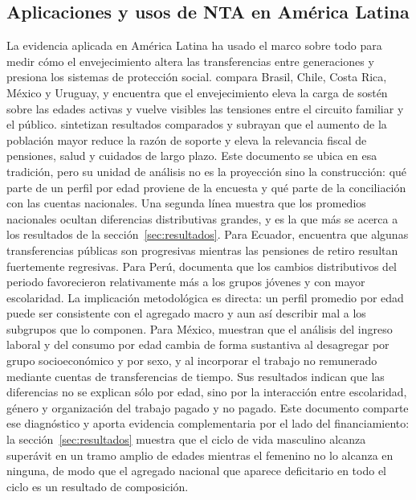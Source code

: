 \documentclass[11pt,a4paper]{article}
\begin{document}
\subsection{Aplicaciones y usos de NTA en América Latina}
La evidencia aplicada en América Latina ha usado el marco sobre todo para medir cómo el
envejecimiento altera las transferencias entre generaciones y presiona los sistemas de protección
social. \citet{RoseroBixby2011Generational} compara Brasil, Chile, Costa Rica, México y Uruguay, y
encuentra que el envejecimiento eleva la carga de sostén sobre las edades activas y vuelve
visibles las tensiones entre el circuito familiar y el público. \citet{Mason2011Population}
sintetizan resultados comparados y subrayan que el aumento de la población mayor reduce la razón
de soporte y eleva la relevancia fiscal de pensiones, salud y cuidados de largo plazo. Este
documento se ubica en esa tradición, pero su unidad de análisis no es la proyección sino la
construcción: qué parte de un perfil por edad proviene de la encuesta y qué parte de la
conciliación con las cuentas nacionales.
Una segunda línea muestra que los promedios nacionales ocultan diferencias distributivas grandes,
y es la que más se acerca a los resultados de la sección~\ref{sec:resultados}. Para Ecuador,
\citet{Rosero2024Socioeconomic} encuentra que algunas transferencias públicas son progresivas
mientras las pensiones de retiro resultan fuertemente regresivas. Para Perú,
\citet{Olivera2023distributive} documenta que los cambios distributivos del periodo favorecieron
relativamente más a los grupos jóvenes y con mayor escolaridad. La implicación metodológica es
directa: un perfil promedio por edad puede ser consistente con el agregado macro y aun así
describir mal a los subgrupos que lo componen.
Para México, \citet{MejiaGuevaraRivero2024} muestran que el análisis del ingreso laboral y del
consumo por edad cambia de forma sustantiva al desagregar por grupo socioeconómico y por sexo, y
al incorporar el trabajo no remunerado mediante cuentas de transferencias de tiempo. Sus
resultados indican que las diferencias no se explican sólo por edad, sino por la interacción entre
escolaridad, género y organización del trabajo pagado y no pagado. Este documento comparte ese
diagnóstico y aporta evidencia complementaria por el lado del financiamiento: la
sección~\ref{sec:resultados} muestra que el ciclo de vida masculino alcanza superávit en un tramo
amplio de edades mientras el femenino no lo alcanza en ninguna, de modo que el agregado nacional
que aparece deficitario en todo el ciclo es un resultado de composición.
\end{document}
